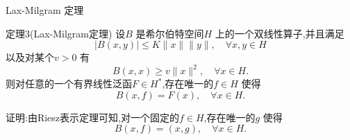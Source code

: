 \begin{frame}[t]{Lax-Milgram 定理}
  \begin{alertblock}{定理3(Lax-Milgram定理)}
  设$B$ 是希尔伯特空间$H$ 上的一个双线性算子,并且满足
  \begin{equation}\label{5}
    |B(x,y)|\le K \|x\|\|y\|,\quad \forall x,y \in  H
  \end{equation}
  以及对某个$v>0$ 有
  \begin{equation}\label{4}
    B(x,x)\ge v\|x\|^2,\quad \forall x \in H.
  \end{equation}
  则对任意的一个有界线性泛函$F\in H^{*}$,存在唯一的$f\in H$ 使得
  \[
    B(x,f)=F(x),\quad \forall x\in H.
  \] 
\end{alertblock}
证明:由Riesz表示定理可知,对一个固定的$f \in H$,存在唯一的$g$ 使得
\[
  B(x,f)=(x,g),\quad \forall x\in H.
\] 
\end{frame}

